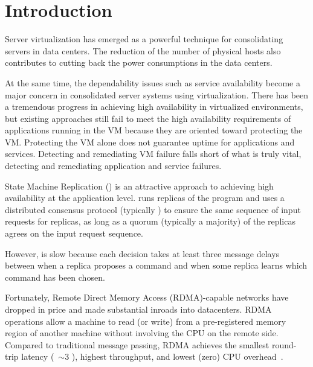 \section{Introduction} \label{sec:intro}

Server virtualization has emerged as a powerful technique for consolidating servers in 
data centers. The reduction of the number of physical hosts also contributes to cutting 
back the power consumptions in the data centers.


At the same time, the dependability issues such as service availability become a major concern 
in consolidated server systems using virtualization. There has been a tremendous progress in 
achieving high availability in virtualized environments, but existing approaches still fail to 
meet the high availability requirements of applications running in the VM because they are oriented 
toward protecting the VM. Protecting the VM alone does not guarantee uptime for applications and
services. Detecting and remediating VM failure falls short of what is truly vital, detecting and 
remediating application and service failures.

State Machine Replication (\smr) is an attractive approach to achieving high availability at the 
application level. \smr runs replicas of the program and uses a distributed consensus protocol 
(typically \paxos) to ensure the same sequence of input requests for replicas, as long as a 
quorum (typically a majority) of the replicas agrees on the input request sequence.

However, \paxos is slow because each decision takes at least three message delays between when 
a replica proposes a command and when some replica learns which command has been chosen.

Fortunately, Remote Direct Memory Access (RDMA)-capable networks have dropped in price and made 
substantial inroads into datacenters. RDMA operations allow a machine to read (or write) from a 
pre-registered memory region of another machine without involving the CPU on the remote side. 
Compared to traditional message passing, RDMA achieves the smallest round-trip latency 
(~$\sim$3 \us), highest throughput, and lowest (zero) CPU overhead~\cite{pilaf:usenix14}.

